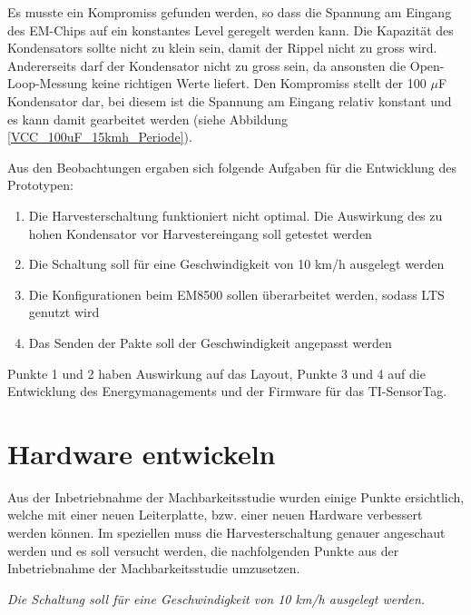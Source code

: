 Es musste ein Kompromiss gefunden werden, so dass die Spannung am Eingang des EM-Chips auf ein konstantes Level geregelt werden kann. Die Kapazität des Kondensators sollte nicht zu klein sein, damit der Rippel nicht zu gross wird. Andererseits darf der Kondensator nicht zu gross sein, da ansonsten die Open-Loop-Messung keine richtigen Werte liefert. Den Kompromiss stellt der 100 $\mu$F Kondensator dar, bei diesem ist die Spannung am Eingang relativ konstant und es kann damit gearbeitet werden (siehe Abbildung \ref{VCC_100uF_15kmh_Periode}).

Aus den Beobachtungen ergaben sich folgende Aufgaben für die Entwicklung des Prototypen:

\begin{enumerate}
    \item Die Harvesterschaltung funktioniert nicht optimal. Die Auswirkung des zu hohen Kondensator vor Harvestereingang soll getestet werden
    \item Die Schaltung soll für eine Geschwindigkeit von 10 km/h ausgelegt werden
    \item Die Konfigurationen beim EM8500 sollen überarbeitet werden, sodass LTS genutzt wird
    \item Das Senden der Pakte soll der Geschwindigkeit angepasst werden
\end{enumerate}

Punkte 1 und 2 haben Auswirkung auf das Layout, Punkte 3 und 4 auf die Entwicklung des Energymanagements und der Firmware für das TI-SensorTag.





\section{Hardware entwickeln}

Aus der Inbetriebnahme der Machbarkeitsstudie wurden einige Punkte ersichtlich, welche mit einer neuen Leiterplatte, bzw. einer neuen Hardware verbessert werden können. Im speziellen muss die Harvesterschaltung genauer angeschaut werden und es soll versucht werden, die nachfolgenden Punkte aus der Inbetriebnahme der Machbarkeitsstudie umzusetzen. 

\textit{Die Schaltung soll für eine Geschwindigkeit von 10 km/h ausgelegt werden.}


